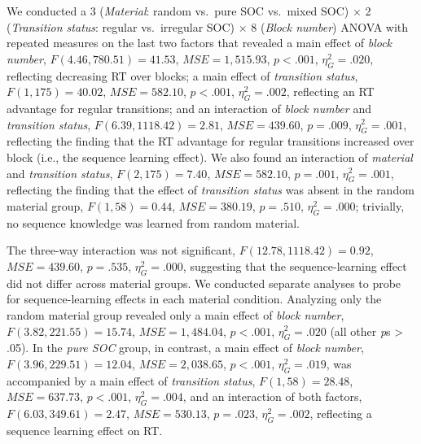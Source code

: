 \documentclass[floatsintext,man]{apa6}
\begin{document}
We conducted a 3 (\emph{Material}: random vs.~pure SOC vs.~mixed SOC)
\(\times\) 2 (\emph{Transition status}: regular vs.~irregular SOC)
\(\times\) 8 (\emph{Block number}) ANOVA with repeated measures on the
last two factors that revealed a main effect of \emph{block number},
\(F(4.46, 780.51) = 41.53\), \(\mathit{MSE} = 1,515.93\), \(p < .001\),
\(\eta^2_G = .020\), reflecting decreasing RT over blocks; a main effect
of \emph{transition status}, \(F(1, 175) = 40.02\),
\(\mathit{MSE} = 582.10\), \(p < .001\), \(\eta^2_G = .002\), reflecting
an RT advantage for regular transitions; and an interaction of
\emph{block number} and \emph{transition status},
\(F(6.39, 1118.42) = 2.81\), \(\mathit{MSE} = 439.60\), \(p = .009\),
\(\eta^2_G = .001\), reflecting the finding that the RT advantage for
regular transitions increased over block (i.e., the sequence learning
effect). We also found an interaction of \emph{material} and
\emph{transition status}, \(F(2, 175) = 7.40\),
\(\mathit{MSE} = 582.10\), \(p = .001\), \(\eta^2_G = .001\), reflecting
the finding that the effect of \emph{transition status} was absent in
the random material group, \(F(1, 58) = 0.44\),
\(\mathit{MSE} = 380.19\), \(p = .510\), \(\eta^2_G = .000\); trivially,
no sequence knowledge was learned from random material.

The three-way interaction was not significant,
\(F(12.78, 1118.42) = 0.92\), \(\mathit{MSE} = 439.60\), \(p = .535\),
\(\eta^2_G = .000\), suggesting that the sequence-learning effect did
not differ across material groups. We conducted separate analyses to
probe for sequence-learning effects in each material condition.
Analyzing only the random material group revealed only a main effect of
\emph{block number}, \(F(3.82, 221.55) = 15.74\),
\(\mathit{MSE} = 1,484.04\), \(p < .001\), \(\eta^2_G = .020\) (all
other \emph{p}s \textgreater{} .05). In the \emph{pure SOC} group, in
contrast, a main effect of \emph{block number},
\(F(3.96, 229.51) = 12.04\), \(\mathit{MSE} = 2,038.65\), \(p < .001\),
\(\eta^2_G = .019\), was accompanied by a main effect of
\emph{transition status}, \(F(1, 58) = 28.48\),
\(\mathit{MSE} = 637.73\), \(p < .001\), \(\eta^2_G = .004\), and an
interaction of both factors, \(F(6.03, 349.61) = 2.47\),
\(\mathit{MSE} = 530.13\), \(p = .023\), \(\eta^2_G = .002\), reflecting
a sequence learning effect on RT.
\end{document}
